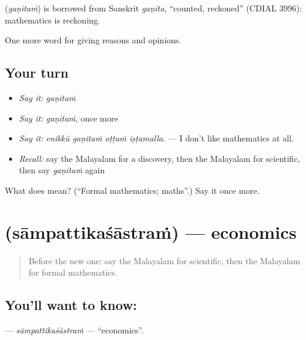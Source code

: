 \begin{cousinweb}
\textbf{} (\emph{gaṇitaṁ}) is borrowed from Sanskrit \emph{gaṇita}, \textquotedblleft{}counted, reckoned\textquotedblright{} (CDIAL 3996): mathematics is reckoning.
\end{cousinweb}

\begin{grammarlens}[title={What you've built}]
One more word for giving reasons and opinions.
\end{grammarlens}

\subsection*{Your turn}
\begin{itemize}
\raggedright
  \item \emph{Say it:} \emph{gaṇitaṁ}
  \item \emph{Say it:} \emph{gaṇitaṁ}, once more
  \item \emph{Say it:} \emph{enikkŭ gaṇitaṁ oṭṭuṁ iṣṭamalla.} — I don't like mathematics at all.
  \item \emph{Recall:} say the Malayalam for a discovery, then the Malayalam for scientific, then say \emph{gaṇitaṁ} again
\end{itemize}

\begin{tcolorbox}[breakable,colback=teal!4,colframe=teal!35!black,title={Before you move on}]
What does  mean? (\textquotedblleft{}Formal mathematics; maths\textquotedblright{}.) Say it once more.
\end{tcolorbox}
\section[\texorpdfstring{\ml{സാമ്പത്തികശാസ്ത്രം} (sāmpattikaśāstraṁ)}{സാമ്പത്തികശാസ്ത്രം (sāmpattikaśāstraṁ)}]{ (sāmpattikaśāstraṁ) — economics}

\label{lesson:ML-C437-sampattikasastram}



\begin{quote}
Before the new one: say the Malayalam for scientific, then the Malayalam for formal mathematics.
\end{quote}

\subsection*{You'll want to know: }
\textbf{} — \emph{sāmpattikaśāstraṁ} — \textquotedblleft{}economics\textquotedblright{}.

